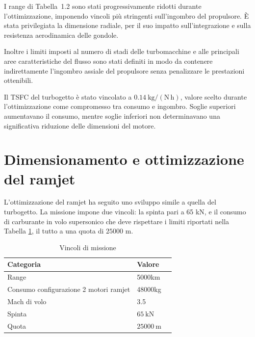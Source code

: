 I range di Tabella~1.2 sono stati progressivamente ridotti durante l'ottimizzazione, imponendo vincoli più stringenti sull'ingombro del propulsore. È stata privilegiata la dimensione radiale, per il suo impatto sull'integrazione e sulla resistenza aerodinamica delle gondole.

Inoltre i limiti imposti al numero di stadi delle turbomacchine e alle principali aree caratteristiche del flusso sono stati definiti in modo da contenere indirettamente l'ingombro assiale del propulsore senza penalizzare le prestazioni ottenibili.

Il TSFC del turbogetto è stato vincolato a \(0.14\ \mathrm{kg/(N\,h)}\), valore scelto durante l'ottimizzazione come compromesso tra consumo e ingombro. Soglie superiori aumentavano il consumo, mentre soglie inferiori non determinavano una significativa riduzione delle dimensioni del motore.



\section{Dimensionamento e ottimizzazione del ramjet}
L'ottimizzazione del ramjet ha seguito uno sviluppo simile a quella del turbogetto. La missione impone due vincoli: la spinta pari a 65 kN, e il consumo di carburante in volo supersonico che deve rispettare i limiti riportati nella Tabella  \ref{tab:vincoli_ramjet}, il tutto a una quota di $25000$ m.

\begin{table}[H]
\centering
\fontsize{11pt}{11pt}\selectfont
\renewcommand{\arraystretch}{1}
\caption{Vincoli di missione}
\label{tab:vincoli_ramjet}
\begin{tabular}{lll}
\toprule
\textbf{Categoria} & \textbf{Valore} \\
\midrule

Range
& 5000km \\

Consumo configurazione 2 motori ramjet
& 48000kg \\

Mach di volo
& 3.5\\

Spinta
& $65\ \mathrm{kN}$ \\

Quota
& $25000\ \mathrm{m}$\\

\bottomrule
\end{tabular}
\end{table}

